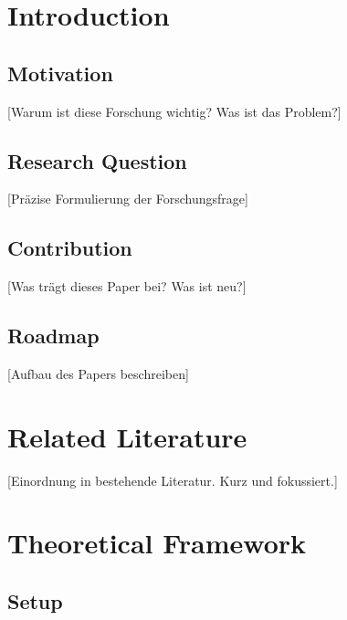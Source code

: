 \documentclass[12pt,a4paper]{article}
\begin{document}
\tableofcontents
\newpage

\section{Introduction}

\subsection{Motivation}

[Warum ist diese Forschung wichtig? Was ist das Problem?]

\subsection{Research Question}

[Präzise Formulierung der Forschungsfrage]

\subsection{Contribution}

[Was trägt dieses Paper bei? Was ist neu?]

\subsection{Roadmap}

[Aufbau des Papers beschreiben]

\section{Related Literature}

[Einordnung in bestehende Literatur. Kurz und fokussiert.]

\section{Theoretical Framework}

\subsection{Setup}
\end{document}
